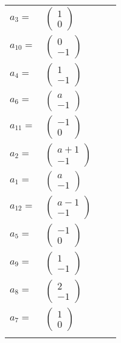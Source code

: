 \documentclass[1p]{elsarticle_modified}
\theoremstyle{definition}
\begin{document}
\begin{tabular}{m{7pt} m{180pt} m{7pt} m{180pt} }
\flushright $a_{3}=$&$\begin{pmatrix}1\\0\end{pmatrix}$ \\
\flushright $a_{10}=$&$\begin{pmatrix}0\\-1\end{pmatrix}$ \\
\flushright $a_{4}=$&$\begin{pmatrix}1\\-1\end{pmatrix}$ \\
\flushright $a_{6}=$&$\begin{pmatrix}a\\-1\end{pmatrix}$ \\
\flushright $a_{11}=$&$\begin{pmatrix}-1\\0\end{pmatrix}$ \\
\flushright $a_{2}=$&$\begin{pmatrix}a+1\\-1\end{pmatrix}$ \\
\flushright $a_{1}=$&$\begin{pmatrix}a\\-1\end{pmatrix}$ \\
\flushright $a_{12}=$&$\begin{pmatrix}a-1\\-1\end{pmatrix}$ \\
\flushright $a_{5}=$&$\begin{pmatrix}-1\\0\end{pmatrix}$ \\
\flushright $a_{9}=$&$\begin{pmatrix}1\\-1\end{pmatrix}$ \\
\flushright $a_{8}=$&$\begin{pmatrix}2\\-1\end{pmatrix}$ \\
\flushright $a_{7}=$&$\begin{pmatrix}1\\0\end{pmatrix}$\\&\end{tabular}
\end{document}
